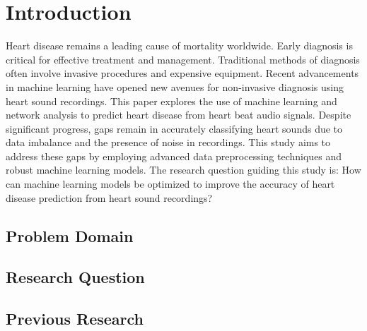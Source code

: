 \section{Introduction}
Heart disease remains a leading cause of mortality worldwide.
Early diagnosis is critical for effective treatment and management.
Traditional methods of diagnosis often involve invasive procedures and expensive equipment.
Recent advancements in machine learning have opened new avenues for non-invasive diagnosis using heart sound recordings.
This paper explores the use of machine learning and network analysis to predict heart disease from heart beat audio signals.
Despite significant progress, gaps remain in accurately classifying heart sounds due to data imbalance and the presence of noise in recordings.
This study aims to address these gaps by employing advanced data preprocessing techniques and robust machine learning models.
The research question guiding this study is: How can machine learning models be optimized to improve the accuracy of heart disease prediction
from heart sound recordings?

\subsection{Problem Domain}

\subsection{Research Question}

\subsection{Previous Research}